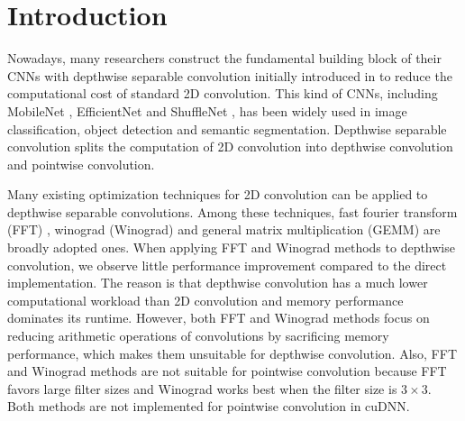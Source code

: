 \section{Introduction}
Nowadays, many researchers construct the fundamental building block of their CNNs with depthwise separable convolution initially introduced in \cite{sifre2014rigid} to reduce the computational cost of standard 2D convolution. 
This kind of CNNs, including MobileNet \cite{Sandler_2018_CVPR,howard2019searching}, EfficientNet \cite{tan2019efficientnet} and ShuffleNet \cite{Ma_2018_ECCV}, has been widely used in image classification, object detection and  semantic segmentation.
Depthwise separable convolution splits the computation of 2D convolution into depthwise convolution and pointwise convolution. 

Many existing optimization techniques for 2D convolution can be applied to depthwise separable convolutions. 
Among these techniques, fast fourier transform (FFT) \cite{vasilache2014fast}, winograd (Winograd) \cite{lavin2016fast} and general matrix multiplication (GEMM) \cite{Vasudevan2017Parallel,Chellapilla2006High} are broadly adopted ones.
When applying FFT and Winograd methods to depthwise convolution, we observe little performance improvement compared to the direct implementation. 
The reason is that depthwise convolution has a much lower computational workload than 2D convolution and memory performance dominates its runtime. 
However, both FFT and Winograd methods focus on reducing arithmetic operations of convolutions by sacrificing memory performance, which makes them unsuitable for depthwise convolution.
Also, FFT and Winograd methods are not suitable for pointwise convolution because FFT favors large filter sizes and Winograd works best when the filter size is $3 \times 3$. Both methods are not implemented for pointwise convolution in cuDNN.

